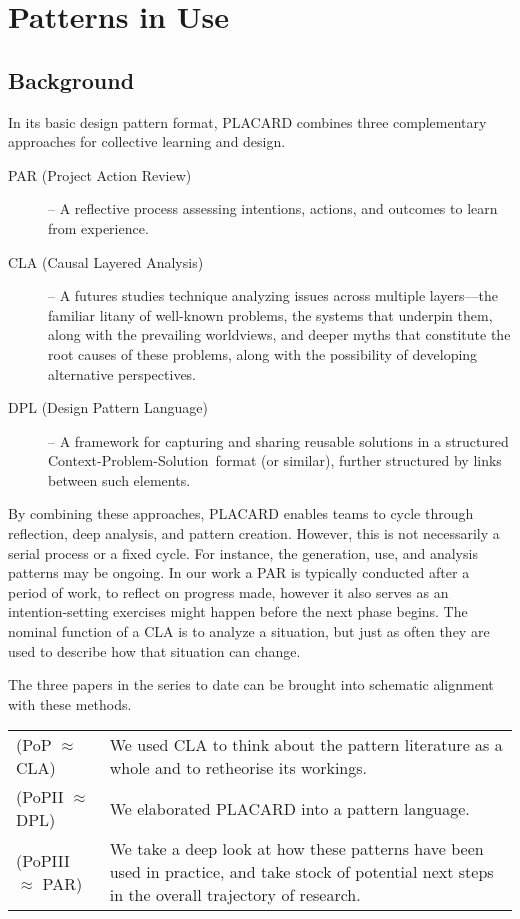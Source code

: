 \documentclass[acmlarge,timestamp]{acmart}
\begin{document}
\section{Patterns in Use}\label{sec:II}

\subsection{Background}

In its basic design pattern format, PLACARD combines three
complementary approaches for collective learning and design.

\begin{description}
\item[PAR (Project Action Review)] -- A reflective process assessing
  intentions, actions, and outcomes to learn from experience.
\item[CLA (Causal Layered Analysis)] -- A futures studies technique
  analyzing issues across multiple layers---the familiar litany of
  well-known problems, the systems that underpin them, along with the
  prevailing worldviews, and deeper myths that constitute the root
  causes of these problems, along with the possibility of developing
  alternative perspectives.
\item[DPL (Design Pattern Language)] -- A framework for capturing and
  sharing reusable solutions in a structured
  Context-Problem-Solution~format (or similar), further structured by
  links between such elements.
\end{description}

By combining these approaches, PLACARD enables teams to cycle
through reflection, deep analysis, and pattern
creation.  However, this is not necessarily a serial process or
a fixed cycle.  For instance, the generation, use, and analysis
patterns may be ongoing.  In our work a PAR is typically
conducted after a period of work, to reflect on progress made,
however it also serves as an intention-setting exercises might
happen before the next phase begins.  The nominal function of a
CLA is to analyze a situation, but just as often they are used
to describe how that situation can change.

The three papers in the series to date can be brought into schematic
alignment with these methods.

\medskip
\begin{tabular}{lp{}}
(PoP $\approx$ CLA) &We used CLA to think about the pattern literature as a whole and to retheorise its workings.\\
(PoPII $\approx$ DPL)& We elaborated PLACARD into a pattern language.\\
(PoPIII $\approx$ PAR)& We take a deep look at how these patterns have been used in practice, and take stock of potential next steps in the overall trajectory of research.\\
\end{tabular}
\end{document}
